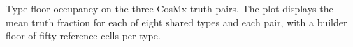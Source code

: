 Type-floor occupancy on the three CosMx truth pairs. The plot displays the mean truth fraction for each of eight shared types and each pair, with a builder floor of fifty reference cells per type.
